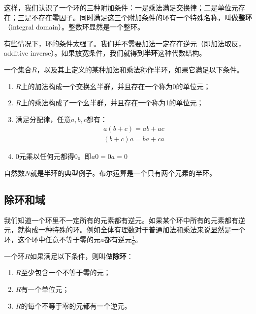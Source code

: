 \documentclass{article}
\begin{document}
这样，我们认识了一个环的三种附加条件：一是乘法满足交换律；二是单位元存在；三是不存在零因子。同时满足这三个附加条件的环有一个特殊名称，叫做\textbf{整环}（integral domain）。整数环显然是一个整环。

有些情况下，环的条件太强了。我们并不需要加法一定存在逆元（即加法取反，additive inverse）。如果放宽条件，我们就得到\textbf{半环}这种代数结构。

\begin{definition}
一个集合$R$，以及其上定义的某种加法和乘法称作半环，如果它满足以下条件。
\begin{enumerate}
\item $R$上的加法构成一个交换幺半群，并且存在一个称为0的单位元；
\item $R$上的乘法构成了一个幺半群，并且存在一个称为1的单位元；
\item 满足分配律，任意$a, b, c$都有：
\[
\begin{array}{l}
a(b + c) = ab + ac \\
(b + c)a = ba + ca
\end{array}
\]
\item 0元乘以任何元都得0。即$a0 = 0a = 0$
\end{enumerate}
\end{definition}
自然数$N$就是半环的典型例子。布尔运算是一个只有两个元素的半环。

\begin{Exercise}
\end{Exercise}

\subsection{除环和域}

我们知道一个环里不一定所有的元素都有逆元。如果某个环中所有的元素都有逆元，就构成一种特殊的环。例如全体有理数对于普通加法和乘法来说显然是一个环，这个环中任意不等于零的元$a$都有逆元$\frac{1}{a}$。

\begin{definition}
一个环$R$如果满足以下条件，则叫做\textbf{除环}：
\begin{enumerate}
\item $R$至少包含一个不等于零的元；
\item $R$有一个单位元；
\item $R$的每个不等于零的元都有一个逆元。
\end{enumerate}
\end{definition}
\end{document}
